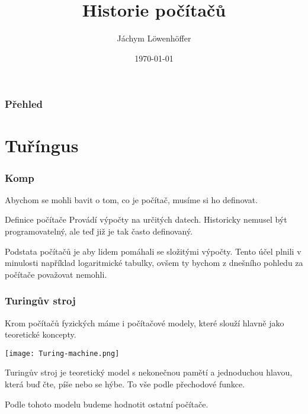 \documentclass{beamer}
\title[amogus]{Historie počítačů} %
\author{Jáchym Löwenhöffer} %
\institute[GEVO] %
{
Gynekologická Evaluace Velkých Obrazů \\ %
\medskip
\textit{jachym.lowenhoffer@gmail.com} %
}
\date{\today} %
\begin{document}
\begin{frame}
	\titlepage %
\end{frame}

\begin{frame}
	\frametitle{Přehled} %
	\tableofcontents %
\end{frame}

\section{Tuříngus}
\label{sec:turingus}


\begin{frame}
	\frametitle{Komp}
Abychom se mohli bavit o tom, co je počítač, musíme si ho definovat.
  \begin{block}{Definice počítače}
	 Provádí výpočty na určitých datech. Historicky nemusel být programovatelný,
	 ale teď již je tak často definovaný.
	\end{block}
	Podstata počítačů je aby lidem pomáhali se složitými výpočty. Tento účel
	plnili v minulosti například logaritmické tabulky, ovšem ty bychom z dnešního
	pohledu za počítače považovat nemohli.
\end{frame}

\begin{frame}
 \frametitle{Turingův stroj}
 Krom počítačů fyzických máme i počítačové modely, které slouží hlavně jako
 teoretické koncepty.

 \centering
 \texttt{[image: Turing-machine.png]}

\raggedright

 Turingův stroj je teoretický model s nekonečnou pamětí a jednoduchou hlavou,
 která buď čte, píše nebo se hýbe. To vše podle přechodové funkce.

 Podle tohoto modelu budeme hodnotit ostatní počítače.
\end{frame}
\end{document}
